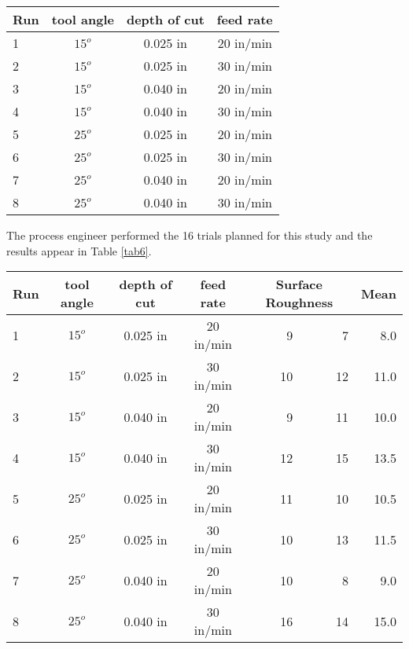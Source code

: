 \begin{sidewaystable}\caption{Metal Cutting Experiment Design}\label{tab5}
\begin{center}
\begin{tabular}{|l|c|c|c|}
\hline Run & \textbf{tool angle} & \textbf{depth of cut} & \textbf{feed rate}\\ 
\hline 1 & $15^{o}$ & 0.025 in & 20 in/min \\ 
\hline 2 & $15^{o}$ & 0.025 in & 30 in/min \\ 
\hline 3 & $15^{o}$ & 0.040 in & 20 in/min \\ 
\hline 4 & $15^{o}$ & 0.040 in & 30 in/min \\
\hline 5 & $25^{o}$ & 0.025 in & 20 in/min \\
\hline 6 & $25^{o}$ & 0.025 in & 30 in/min \\
\hline 7 & $25^{o}$ & 0.040 in & 20 in/min \\
\hline 8 & $25^{o}$ & 0.040 in & 30 in/min \\ 
\hline 
\end{tabular} 
\end{center}
\end{sidewaystable}

The process engineer performed the 16 trials planned for this study and the results appear in Table \ref{tab6}.
\begin{sidewaystable}[h]\caption{Metal Cutting Experiment Data Table}\label{tab6}
\begin{center}
\begin{tabular}{|l|c|c|c|r|r|r|}
\hline Run & \textbf{tool angle} & \textbf{depth of cut} & \textbf{feed rate} & \multicolumn{2}{c|}{\textbf{Surface Roughness}} & \textbf{Mean}\\ 
\hline 1 & $15^{o}$ & 0.025 in & 20 in/min &  9 &  7 &  8.0\\ 
\hline 2 & $15^{o}$ & 0.025 in & 30 in/min & 10 & 12 & 11.0\\ 
\hline 3 & $15^{o}$ & 0.040 in & 20 in/min &  9 & 11 & 10.0\\ 
\hline 4 & $15^{o}$ & 0.040 in & 30 in/min & 12 & 15 & 13.5\\
\hline 5 & $25^{o}$ & 0.025 in & 20 in/min & 11 & 10 & 10.5\\
\hline 6 & $25^{o}$ & 0.025 in & 30 in/min & 10 & 13 & 11.5\\
\hline 7 & $25^{o}$ & 0.040 in & 20 in/min & 10 &  8 &  9.0\\
\hline 8 & $25^{o}$ & 0.040 in & 30 in/min & 16 & 14 & 15.0\\ 
\hline 

\end{tabular} 
\end{center}
\end{sidewaystable}
